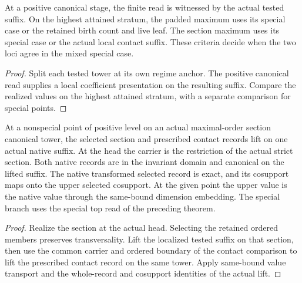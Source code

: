 \begin{theorem}
\label{hir:g1-actual-positive-stage-keys}
\leanok
At a positive canonical stage, the finite read is witnessed by the
actual tested suffix. On the highest attained stratum, the padded
maximum uses its special case or the retained birth count and live
leaf. The section maximum uses its special case or the actual local
contact suffix. These criteria decide when the two loci agree in the
mixed special case.
\end{theorem}
\begin{proof}
Split each tested tower at its own regime anchor. The positive
canonical read supplies a local coefficient presentation on the
resulting suffix. Compare the realized values on the highest
attained stratum, with a separate comparison for special points.
\end{proof}

\begin{theorem}
\label{hir:g1-native-positive-section-phase}
\leanok
At a nonspecial point of positive level on an actual maximal-order
section canonical tower, the selected section and prescribed contact
records lift on one actual native suffix. At the head the carrier
is the restriction of the actual strict section. Both native records
are in the invariant domain and canonical on the lifted suffix.
The native transformed selected record is exact, and its cosupport
maps onto the upper selected cosupport. At the given point the upper
value is the native value through the same-bound dimension embedding.
The special branch uses the special top read of the preceding theorem.
\end{theorem}
\begin{proof}
Realize the section at the actual head. Selecting the retained ordered
members preserves transversality. Lift the localized tested suffix on
that section, then use the common carrier and ordered boundary of the
contact comparison to lift the prescribed contact record on the same
tower. Apply same-bound value transport and the whole-record and
cosupport identities of the actual lift.
\end{proof}


